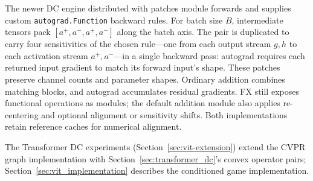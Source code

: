 The newer DC engine distributed with \textcite{playingBackward2026} patches module forwards and supplies custom \texttt{autograd.Function} backward rules. For batch size $B$, intermediate tensors pack $[a^+,a^-,a^+,a^-]$ along the batch axis. The pair is duplicated to carry four sensitivities of the chosen rule---one from each output stream $g,h$ to each activation stream $a^+,a^-$---in a single backward pass: autograd requires each returned input gradient to match its forward input's shape. These patches preserve channel counts and parameter shapes. Ordinary addition combines matching blocks, and autograd accumulates residual gradients. FX still exposes functional operations as modules; the default addition module also applies re-centering and optional alignment or sensitivity shifts. Both implementations retain reference caches for numerical alignment.

The Transformer DC experiments (Section~\ref{sec:vit-extension}) extend the CVPR graph implementation with Section~\ref{sec:transformer_dc}'s convex operator pairs; Section~\ref{sec:vit_implementation} describes the conditioned game implementation.
